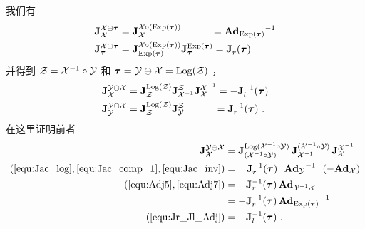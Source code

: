 我们有
%
\begin{align}
\mjac{\cX\op\bftau}{\cX}
 &= \mjac{\cX\circ(\Exp(\bftau))}{\cX} 
 ~~~~~~~~~= \Ad[\cM]{\Exp(\bftau)}\inv \\
\mjac{\cX\op\bftau}{\bftau}
 &= \mjac{\cX\circ(\Exp(\bftau))}{\Exp(\bftau)}\mjac{\Exp(\bftau)}{\bftau}
 = \mjac{}{r}(\bftau) 
\end{align}
%
并得到 $\cZ=\cX\inv\circ\cY$ 和 $\bftau=\cY\om\cX=\Log(\cZ)$ ，
%
\begin{align}
\mjac{\cY\om\cX}{\cX}
 &= \mjac{\Log(\cZ)}{\cZ}\mjac{\cZ}{\cX\inv}\mjac{\cX\inv}{\cX} 
  = -\mjac{-1}{l}(\bftau)
 \\
\mjac{\cY\om\cX}{\cY}
 &= \mjac{\Log(\cZ)}{\cZ}\mjac{\cZ}{\cY} 
 ~~~~~~~~~= \mjac{-1}{r}(\bftau)
~.
\end{align}
%
在这里证明前者
%
\begin{align*}
\mjac{\cY\om\cX}{\cX}
 &= \mjac{\Log(\cX\inv\circ\cY)}{(\cX\inv\circ\cY)}\,\mjac{(\cX\inv\circ\cY)}{\cX\inv}\,\mjac{\cX\inv}{\cX} 
 \notag\\ 
 (\ref{equ:Jac_log},\ref{equ:Jac_comp_1},\ref{equ:Jac_inv})
 &= ~~\,\mjac{-1}{r}(\bftau)~~\Ad[\cM]{\cY}\inv~~(-\Ad[\cM]{\cX}) 
 \notag\\ 
 (\ref{equ:Adj5},\ref{equ:Adj7})
 &= -\mjac{-1}{r}(\bftau)\,\Ad[\cM]{\cY\inv\cX} 
 \notag\\ 
 &= -\mjac{-1}{r}(\bftau)\,\Ad[\cM]{\Exp(\bftau)}\inv
 \notag\\
 (\ref{equ:Jr_Jl_Adj})
 &
 = -\mjac{-1}{l}(\bftau)
 ~.
\end{align*}



